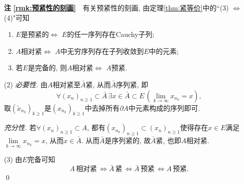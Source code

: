     \textbf{注\,\,\ref{rmk:预紧性的刻画}}\ \ 有关预紧性的刻画, 由定理\ref{thm:紧等价}中的``(3) $ \Leftrightarrow $ (4)"可知
    \begin{enumerate}[(1)]
    \item $ E $是预紧的$ \Longleftrightarrow $ $ E $的任一序列存在Cauchy子列;
    \item $ A $相对紧$ \Longleftrightarrow $ $ A $中无穷序列存在子列收敛到$ E $中的元素;
    \item 若$ E $是完备的, 则$ A $相对紧$ \Longleftrightarrow $ $ A $预紧.
    \end{enumerate}
    \begin{Proof}
    (2) \textsl{必要性.} 由$ A $相对紧至$ \bar{A} $紧, 从而$ \bar{A} $序列紧, 即
    \[
    \forall (x_n)_{n\geqslant 1}\subset\bar{A}\,\exists x\in\bar{A}\subset E\,(\lim_{k\to\infty}x_{n_k}=x),
    \]
    取$ (\tilde{x}_{n_k})_{k\geqslant 1} $是$ (x_{n_k})_{k\geqslant 1} $中去掉所有$ \partial A $中元素构成的序列即可.
    
    \textsl{充分性.} 若$ \forall (x_n)_{n\geqslant 1}\subset A $, 都有$ (x_{n_k})_{n\geqslant 1}\subset(x_n)_{n\geqslant 1} $使得存在$ x\in E $满足$ \lim\limits_{k\to\infty}x_{n_k}=x $, 从而$ x\in\bar{A} $. 从而$ \bar{A} $是序列紧的, 故$ \bar{A} $紧, 也即$ A $相对紧.
    
    (3) 由$ E $完备可知
    \[
    A\,\text{相对紧}\,\Longleftrightarrow\bar{A}\,\text{紧}\,\Longleftrightarrow\bar{A}\,\text{预紧}\,\Longleftrightarrow A\,\text{预紧}.
    \]
    \qed
    \end{Proof}
    
